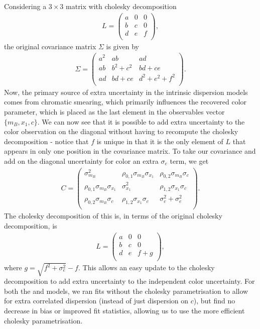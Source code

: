\documentclass[a4paper,fleqn,usenatbib]{emulateapj}
\newcommand{\gten}{\citetalias{Guy2010}}
\newcommand{\celeven}{\citetalias{Chotard2011}}
\begin{document}
Considering a $3\times3$ matrix with cholesky decomposition
\begin{align}
L = \begin{pmatrix}
a & 0 & 0 \\ b & c & 0 \\ d & e & f \\
\end{pmatrix},
\end{align}
the original covariance matrix $\Sigma$ is given by
\begin{align}
\Sigma = \begin{pmatrix}
a^2 & ab & ad \\ ab & b^2 + c^2 & bd + ce \\ ad & bd + ce & d^2 + e^2 + f^2\\
\end{pmatrix}.
\end{align}
Now, the primary source of extra uncertainty in the intrinsic dispersion models comes from chromatic smearing, which primarily influences the recovered color parameter, which is placed as the last element in the observables vector $\lbrace m_B, x_1, c\rbrace$. We can now see that it is possible to add extra uncertainty to the color observation on the diagonal without having to recompute the cholesky decomposition - notice that $f$ is unique in that it is the only element of $L$ that appears in only one position in the covariance matrix. To take our covariance and add on the diagonal uncertainty for color an extra $\sigma_e$ term, we get
\begin{align}
C = \begin{pmatrix}
\sigma_{m_B}^2 & \rho_{0,1} \sigma_{m_B} \sigma_{x_1} & \rho_{0,2} \sigma_{m_B} \sigma_c \\
\rho_{0,1} \sigma_{m_B} \sigma_{x_1} & \sigma_{x_1}^2 & \rho_{1, 2} \sigma_{x_1} \sigma_c \\
\rho_{0,2} \sigma_{m_B} \sigma_c & \rho_{1, 2} \sigma_{x_1} \sigma_c &  \sigma_c^2 + \sigma_e^2 \\
\end{pmatrix}.
\end{align}
The cholesky decomposition of this is, in terms of the original cholesky decomposition, is
\begin{align}
L = \begin{pmatrix}
a & 0 & 0 \\ b & c & 0 \\ d & e & f + g \\
\end{pmatrix},
\end{align}
where $g = \sqrt{f^2 + \sigma_e^2} - f$. This allows an easy update to the cholesky decomposition to add extra uncertainty to the independent color uncertainty. For both the {\gten} and {\celeven} models, we ran fits without the cholesky parametrisation to allow for extra correlated dispersion (instead of just dispersion on $c$), but find no decrease in bias or improved fit statistics, allowing us to use the more efficient cholesky parametrisation.
\end{document}
